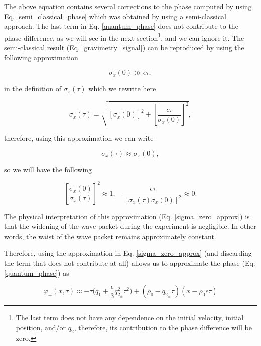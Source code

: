 \documentclass{article}
\begin{document}
The above equation contains several corrections to the phase computed by using Eq. \ref{semi_classical_phase} which was obtained by using a semi-classical approach. The last term in Eq. \ref{quantum_phase} does not contribute to the phase difference, as we will see in the next section\footnote{The last term does not have any dependence on the initial velocity, initial position, and/or $q_{2}$, therefore, its contribution to the phase difference will be zero.}, and we can ignore it. The semi-classical result (Eq. \ref{gravimetry_signal}) can be reproduced by using the following approximation

\begin{equation}\label{sigma_zero_approx}
\sigma_{x}(0) \gg \epsilon \tau,
\end{equation}

in the definition of $\sigma_{x}(\tau)$ which we rewrite here

\begin{equation*}
\sigma_{x}(\tau) = \sqrt{[\sigma_{x}(0)]^{2} + \left[\frac{\epsilon \tau}{\sigma_{x}(0)} \right]^{2}},
\end{equation*}

therefore, using this approximation we can write

\begin{equation*}
\sigma_{x}(\tau) \approx \sigma_{x}(0),
\end{equation*}

so we will have the following

\begin{equation}\label{sigma_quotient_approx}
\left[\frac{\sigma_{x}(0)}{\sigma_{x}(\tau)} \right]^{2} \approx 1 \mathrm{,}\quad \frac{\epsilon \tau}{ [\sigma_{x}(\tau)\sigma_{x}(0)]^{2}} \approx 0.
\end{equation}

The physical interpretation of this approximation (Eq. \ref{sigma_zero_approx}) is that the widening of the wave packet during the experiment is negligible. In other words, the waist of the wave packet remains approximately constant.

Therefore, using the approximation in Eq. \ref{sigma_zero_approx} (and discarding the term that does not contribute at all) allows us to approximate the phase (Eq. \ref{quantum_phase}) as

\begin{equation}\label{approx_quantum_phase}
\varphi_{\pm}(x, \tau) \approx -\tau \bigg(q_{1} + \frac{\epsilon}{3} q_{2_{\pm}}^{2} \tau^{2}\bigg) + (\rho_{0} - q_{2_{\pm}} \tau)(x-\rho_{0} \epsilon \tau)
\end{equation}
\end{document}
